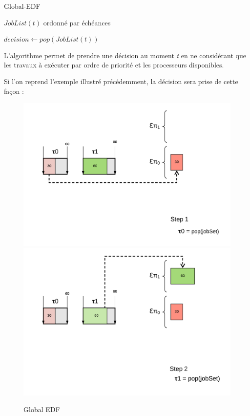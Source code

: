 	\begin{algorithm}
	\caption{Global-EDF}
	\begin{algorithmic}
		\REQUIRE $JobList(t)$ ordonné par échéances
			\item $decision \leftarrow pop(JobList(t))$
		\ENDFOR
	\end{algorithmic}
\end{algorithm}	
	
	L'algorithme permet de prendre une décision au moment \textit{t} en ne considérant 
	que les travaux à exécuter par ordre de priorité et les processeurs disponibles.
	
	Si l'on reprend l'exemple illustré précédemment, la décision sera prise de cette façon :
	
	\begin{figure}[H]
		\includegraphics[scale=0.5]{img/gedf/gedf}
		\includegraphics[scale=0.5]{img/gedf/gedf2}
		\caption{Global EDF}
	\end{figure}
	 
